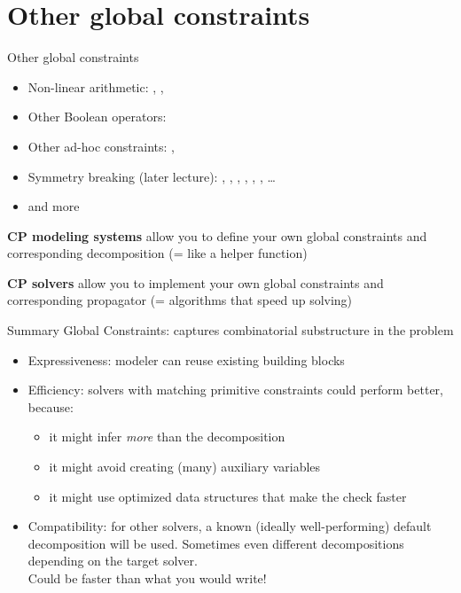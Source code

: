 \documentclass{cons-beamer}
\begin{document}

\section{Other global constraints}

\begin{frame}{Other global constraints}
	\begin{itemize}
		\item Non-linear arithmetic: , , 
		\item Other Boolean operators: 
		\item Other ad-hoc constraints: , 
		\item Symmetry breaking (later lecture): , , , , , , \ldots
		\item and more
	\end{itemize}
	\vfill
	
	\textbf{CP modeling systems} allow you to define your own global constraints and corresponding decomposition (= like a helper function)
	\vfill
	
	\textbf{CP solvers} allow you to implement your own global constraints and corresponding propagator (= algorithms that speed up solving)
\end{frame}

\begin{frame}{Summary}
  Global Constraints: captures combinatorial substructure in the problem
    \vfill

  \begin{itemize}
  	\item Expressiveness: modeler can reuse existing building blocks \vfill
  	\item Efficiency: solvers with matching primitive constraints could perform better, because: 
  	\begin{itemize}
  		\item it might infer \textit{more} than the decomposition
  		\item it might avoid creating (many) auxiliary variables
  		\item it might use optimized data structures that make the check faster
  	\end{itemize} \vfill
  	\item Compatibility: for other solvers, a known (ideally well-performing) default decomposition will be used. Sometimes even different decompositions depending on the target solver. \\
  	Could be faster than what you would write!
  \end{itemize}
\end{frame}
\end{document}

